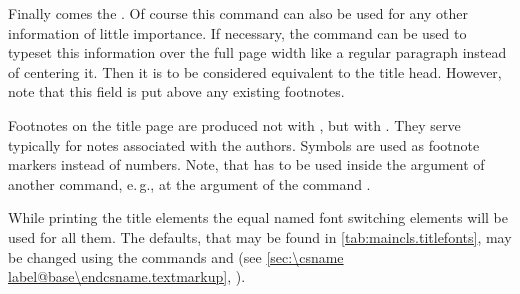 Finally comes the
. Of course this command can also
be used for any other information of little importance. If necessary, the
 command can be used to typeset this information over the full
page width like a regular paragraph instead of centering it.  Then it is to be
considered equivalent to the title head. However, note that this field is put
above any existing footnotes.

Footnotes on the title page are
produced not with , but with . They serve
typically for notes associated with the authors. Symbols are used as footnote
markers instead of numbers. Note, that  has
to be used inside the argument of another command, e.\,g., at the argument
 of the command .

While printing the title elements the
equal named font switching elements will be used for all them. The defaults,
that may be found in \autoref{tab:maincls.titlefonts}, %
%
may be changed using the commands  and
 (see \autoref{sec:\csname
  label@base\endcsname.textmarkup}, ).   

